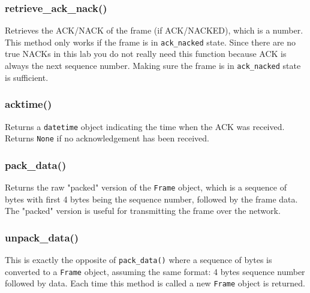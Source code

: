 \documentclass[11pt]{article}
\begin{document}
\subsubsection{retrieve\_ack\_nack()}
Retrieves the ACK/NACK of the frame (if ACK/NACKED), which is a number. This method only works if the frame is in \texttt{ack\_nacked} state.
Since there are no true NACKs in this lab you do not really need this function because ACK is always the next sequence number.
Making sure the frame is in \texttt{ack\_nacked} state is sufficient.

\subsubsection{acktime()}
Returns a \texttt{datetime} object indicating the time when the ACK was received.
Returns \texttt{None} if no acknowledgement has been received.

\subsubsection{pack\_data()}
Returns the raw "packed" version of the \texttt{Frame} object, which is a sequence of bytes with first 4 bytes being the sequence number, followed by the frame data.
The "packed" version is useful for transmitting the frame over the network.

\subsubsection{unpack\_data()}
This is exactly the opposite of \texttt{pack\_data()} where a sequence of bytes is converted to a \texttt{Frame} object, assuming the same format: 4 bytes sequence number followed by data.
Each time this method is called a new \texttt{Frame} object is returned.
\end{document}
